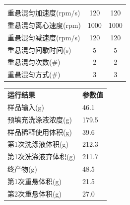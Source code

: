 \documentclass[UTF8,10pt,a4paper,fontset=fandol]{ctexart}
\newcommand{\fieldvalue}[1]{#1}
\begin{document}
\begin{tabularx}{\textwidth}{@{}>{\raggedright\arraybackslash}Xcc@{}}
\fieldvalue{1} \\
重悬混匀加速度(rpm/s) &
\fieldvalue{120} &
\fieldvalue{120} \\
重悬混匀离心速度(rpm) &
\fieldvalue{1000} &
\fieldvalue{1000} \\
重悬混匀减速度(rpm/s) &
\fieldvalue{120} &
\fieldvalue{120} \\
重悬混匀间歇时间(s) &
\fieldvalue{5} &
\fieldvalue{5} \\
重悬混匀次数(\#) &
\fieldvalue{2} &
\fieldvalue{2} \\
重悬混匀方式(\#) &
\fieldvalue{3} &
\fieldvalue{3}
\end{tabularx}

\vspace{1em}

\begin{tabularx}{\textwidth}{@{}>{\raggedright\arraybackslash}Xl@{}}
\textbf{运行结果} & \textbf{参数值} \\
样品输入(g) &
\fieldvalue{46.1} \\
预填充洗涤液浓度(g) &
\fieldvalue{179.5} \\
样品稀释使用体积(g) &
\fieldvalue{39.6} \\
第1次洗涤液体积(g) &
\fieldvalue{212.3} \\
第1次洗涤液弃体积(g) &
\fieldvalue{211.7} \\
终产物(g) &
\fieldvalue{48.5} \\
第1次重悬体积(g) &
\fieldvalue{21.5} \\
第2次重悬体积(g) &
\fieldvalue{27.0}
\end{tabularx}
\end{document}
